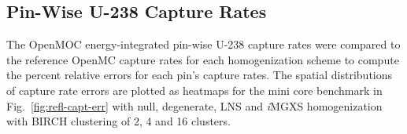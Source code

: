 \documentclass[12pt,twoside]{mitthesis-exec}
\begin{document}
%

\subsection*{Pin-Wise U-238 Capture Rates}

The OpenMOC energy-integrated pin-wise U-238 capture rates were compared to the reference OpenMC capture rates for each homogenization scheme to compute the percent relative errors for each pin's capture rates. The spatial distributions of capture rate errors are plotted as heatmaps for the mini core benchmark in Fig.~\ref{fig:refl-capt-err} with null, degenerate, LNS and \textit{i}MGXS homogenization with BIRCH clustering of 2, 4 and 16 clusters.
\end{document}
